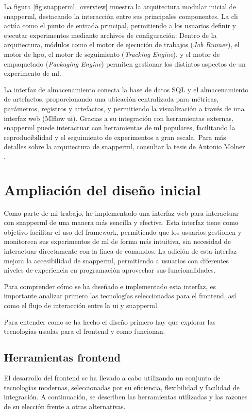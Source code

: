 La figura \ref{fig:snapperml_overview} muestra la arquitectura modular inicial de \Gls{snapperml}, destacando la interacción entre sus principales componentes. La \acrfull{cli} actúa como el punto de entrada principal, permitiendo a los usuarios definir y ejecutar experimentos mediante archivos de configuración. Dentro de la arquitectura, módulos como el motor de ejecución de trabajos (\textit{Job Runner}), el motor de \acrlong{hpo}, el motor de seguimiento (\textit{Tracking Engine}), y el motor de empaquetado (\textit{Packaging Engine}) permiten gestionar los distintos aspectos de un experimento de \acrlong{ml}.

La interfaz de almacenamiento conecta la base de datos SQL y el almacenamiento de \gls{artefactos}, proporcionando una ubicación centralizada para métricas, parámetros, registros y \gls{artefactos}, y permitiendo la visualización a través de una interfaz web (Mlflow \acrshort{ui}). Gracias a su integración con herramientas externas, \Gls{snapperml} puede interactuar con herramientas de \acrlong{ml} populares, facilitando la reproducibilidad y el seguimiento de experimentos a gran escala. Para más detalles sobre la arquitectura de \Gls{snapperml}, consultar la tesis de Antonio Molner \cite{snapperml_thesis}.

\section{Ampliación del diseño inicial}
Como parte de mi trabajo, he implementado una interfaz web para interactuar con \Gls{snapperml} de una manera más sencilla y efectiva. Esta interfaz tiene como objetivo facilitar el uso del \gls{framework}, permitiendo que los usuarios gestionen y monitoreen sus experimentos de \acrlong{ml} de forma más intuitiva, sin necesidad de interactuar directamente con la línea de comandos. La adición de esta interfaz mejora la accesibilidad de \Gls{snapperml}, permitiendo a usuarios con diferentes niveles de experiencia en programación aprovechar sus funcionalidades.

Para comprender cómo se ha diseñado e implementado esta interfaz, es importante analizar primero las tecnologías seleccionadas para el \gls{frontend}, así como el flujo de interacción entre la \acrfull{ui} y \Gls{snapperml}.

Para entender como se ha hecho el diseño primero hay que explorar las tecnologías usadas para el \gls{frontend} y como funcionan.

\subsection{Herramientas frontend}
El desarrollo del \gls{frontend} se ha llevado a cabo utilizando un conjunto de tecnologías modernas, seleccionadas por su eficiencia, flexibilidad y facilidad de integración. A continuación, se describen las herramientas utilizadas y las razones de su elección frente a otras alternativas.

